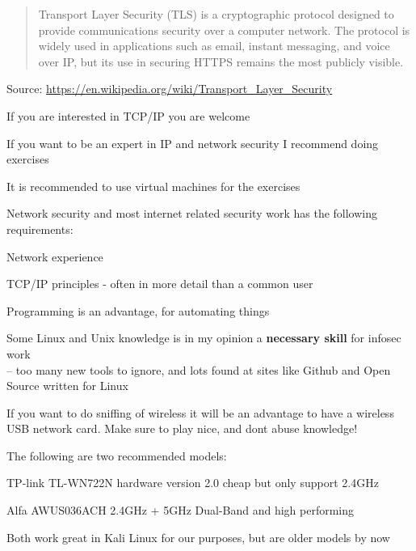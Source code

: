 \documentclass[Screen16to9,17pt]{foils}
\begin{document}
\begin{quote}\small
Transport Layer Security (TLS) is a cryptographic protocol designed to provide communications security over a computer network. The protocol is widely used in applications such as email, instant messaging, and voice over IP, but its use in securing HTTPS remains the most publicly visible.
\end{quote}
Source: \url{https://en.wikipedia.org/wiki/Transport_Layer_Security}




If you are interested in TCP/IP you are welcome

If you want to be an expert in IP and network security I recommend doing exercises

\begin{list1}
\item It is recommended to use virtual machines for the exercises
\item Network security and most internet related security work has the following requirements:
\begin{list2}
\item Network experience
\item TCP/IP principles - often in more detail than a common user
\item Programming is an advantage, for automating things
\item Some Linux and Unix knowledge is in my opinion a {\bf necessary skill} for infosec work\\
-- too many new tools to ignore, and lots found at sites like Github and Open Source written for Linux
\end{list2}
\end{list1}




If you want to do sniffing of wireless it will be an advantage to have a wireless USB network card. Make sure to play nice, and dont abuse knowledge!

\begin{list2}
\item The following are two recommended models:
\item TP-link TL-WN722N hardware version 2.0 cheap but only support 2.4GHz
\item Alfa AWUS036ACH 2.4GHz + 5GHz Dual-Band and high performing
\item Both work great in Kali Linux for our purposes, but are older models by now
\end{list2}
\end{document}
